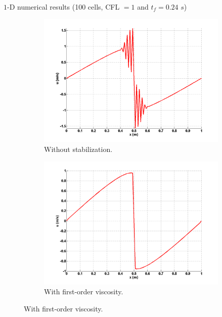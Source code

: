 \documentclass[xcolor=dvipsnames,10pt]{beamer}
\begin{document}
\begin{frame}{$1$-D numerical results (100 cells, CFL $=1$ and $t_f=0.24$ $s$)}
\begin{figure}[H]
        \centering
        \begin{subfigure}[b]{0.37\textwidth}
                \centering
                \includegraphics[width=\textwidth]{../figures/1D_sol_free.png}
                \caption{Without stabilization.}
        \end{subfigure}%
        \begin{subfigure}[b]{0.37\textwidth}
                \centering
                \includegraphics[width=\textwidth]{../figures/1D_sol_fo.png}
                \caption{With first-order viscosity.}
        \end{subfigure}
        

\end{figure}
\end{frame}
\end{document}
